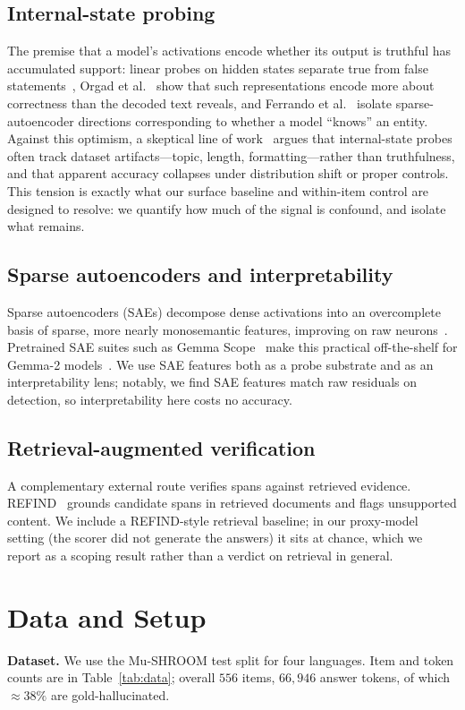 \documentclass[conference]{IEEEtran}
\begin{document}
\subsection{Internal-state probing}
The premise that a model's activations encode whether its output is truthful
has accumulated support: linear probes on hidden states separate true from
false statements~\cite{azaria}, Orgad et al.~\cite{orgad} show that such
representations encode more about correctness than the decoded text reveals,
and Ferrando et al.~\cite{ferrando} isolate sparse-autoencoder directions
corresponding to whether a model ``knows'' an entity. Against this optimism, a
skeptical line of work~\cite{skeptic} argues that internal-state probes often
track dataset artifacts---topic, length, formatting---rather than truthfulness,
and that apparent accuracy collapses under distribution shift or proper
controls. This tension is exactly what our surface baseline and within-item
control are designed to resolve: we quantify how much of the signal is
confound, and isolate what remains.

\subsection{Sparse autoencoders and interpretability}
Sparse autoencoders (SAEs) decompose dense activations into an overcomplete
basis of sparse, more nearly monosemantic features, improving on raw
neurons~\cite{monosemantic,cunningham}. Pretrained SAE suites such as Gemma
Scope~\cite{gemmascope} make this practical off-the-shelf for Gemma-2
models~\cite{gemma2}. We use SAE features both as a probe substrate and as an
interpretability lens; notably, we find SAE features match raw residuals on
detection, so interpretability here costs no accuracy.

\subsection{Retrieval-augmented verification}
A complementary external route verifies spans against retrieved evidence.
REFIND~\cite{refind} grounds candidate spans in retrieved documents and flags
unsupported content. We include a REFIND-style retrieval baseline; in our
proxy-model setting (the scorer did not generate the answers) it sits at
chance, which we report as a scoping result rather than a verdict on retrieval
in general.


\section{Data and Setup}
\textbf{Dataset.} We use the Mu-SHROOM test split for four languages. Item and
token counts are in Table~\ref{tab:data}; overall $556$ items, $66{,}946$
answer tokens, of which $\approx 38\%$ are gold-hallucinated.
\end{document}
